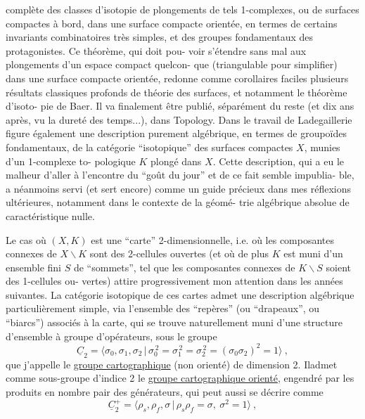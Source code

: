 
complète des classes d'isotopie de plongements de tels 1-complexes,
ou de surfaces compactes à bord, dans une surface compacte orientée,
en termes de certains invariants combinatoires très simples, et des
groupes fondamentaux des protagonistes. Ce théorème, qui doit pou-%
voir s'étendre sans mal aux plongements d'un espace compact quelcon-%
que (triangulable pour simplifier) dans une surface compacte orientée,
redonne comme corollaires faciles plusieurs résultats classiques
profonds de théorie des surfaces, et notamment le théorème d'isoto-%
pie de Baer. Il va finalement être publié, séparément du reste (et
dix ans après, vu la dureté des temps...), dans Topology. Dans le
travail de Ladegaillerie figure également une description purement
algébrique, en termes de groupoïdes fondamentaux, de la catégorie
``isotopique'' des surfaces compactes $X$, munies d'un 1-complexe to-%
pologique $K$ plongé dans $X$. Cette description, qui a eu le malheur
d'aller à l'encontre du ``goût du jour'' et de ce fait semble impublia-%
ble, a néanmoins servi (et sert encore) comme un guide précieux dans
mes réflexions ultérieures, notamment dans le contexte de la géomé-%
trie algébrique absolue de caractéristique nulle.

Le cas où $(X,K)$ est une ``carte'' 2-dimensionnelle, i.e.
où les composantes connexes de $X\backslash K$ sont des 2-cellules ouvertes
(et où de plus $K$ est muni d'un ensemble fini $S$ de ``sommets'',
tel que les composantes connexes de $K\backslash S$ soient des 1-cellules ou-%
vertes) attire progressivement mon attention dans les années suivantes.
La catégorie isotopique de ces cartes admet une description algébrique
particulièrement simple, via l'ensemble des ``repères'' (ou ``drapeaux'',
ou ``biarcs'') associés à la carte, qui se trouve naturellement muni
d'une structure d'ensemble à groupe d'opérateurs, sous le groupe
\[ \underline{C}_2 = \langle \sigma_0,\sigma_1,\sigma_2 \,|\, \sigma_0^{\,2} = \sigma_1^{\,2} = \sigma_2^{\,2} = (\sigma_0\sigma_2)^2 = 1 \rangle \ , \]
que j'appelle le \uline{groupe cartographique} (non orienté) de dimension 2.
Iladmet comme sous-groupe d'indice 2 le \uline{groupe cartographique orienté},
engendré par les produits en nombre pair des générateurs, qui peut
aussi se décrire comme
\[ \underline{C}_2^{+} = \langle \rho_s,\rho_f,\sigma \,|\, \rho_s\rho_f = \sigma,\ \sigma^2 = 1 \rangle \ , \]

